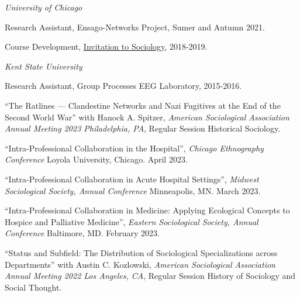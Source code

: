 \documentclass[11pt,article,oneside]{memoir}
\begin{document}
\bigskip

\newpage

\medskip
\noindent\emph{University of Chicago \vspace{0.01in}}

\ind Research Assistant, Ensago-Networks Project, Sumer and Autumn 2021. \vspace{0.05in}

\ind Course Development, \underline{Invitation to Sociology}, 2018-2019. \vspace{0.05in}

\smallskip
\noindent\emph{Kent State University \vspace{0.01in}}

\ind Research Assistant, Group Processes EEG Laboratory, 2015-2016. \vspace{0.1in}

\normalsize

\bigskip

\medskip

\ind ``The Ratlines --- Clandestine Networks and Nazi Fugitives at the End of the Second World War'' with Hanock A. Spitzer, \emph{American Sociological Association Annual Meeting 2023 Philadelphia, PA}, Regular Session Historical Sociology. \vspace{0.05in}

\ind ``Intra-Professional Collaboration in the Hospital'', \emph{Chicago Ethnography Conference} Loyola University, Chicago. April 2023. \vspace{0.05in}

\ind ``Intra-Professional Collaboration in Acute Hospital Settings'', \emph{Midwest Sociological Society, Annual Conference} Minneapolis, MN. March 2023. \vspace{0.05in}

\ind ``Intra-Professional Collaboration in Medicine: Applying Ecological Concepts to Hospice and Palliative Medicine'', \emph{Eastern Sociological Society, Annual Conference} Baltimore, MD. February 2023. \vspace{0.05in} 

\ind ``Status and Subfield: The Distribution of Sociological Specializations across Departments'' with Austin C. Kozlowski, \emph{American Sociological Association Annual Meeting 2022 Los Angeles, CA}, Regular Session History of Sociology and Social Thought. \vspace{0.005in}
\end{document}
